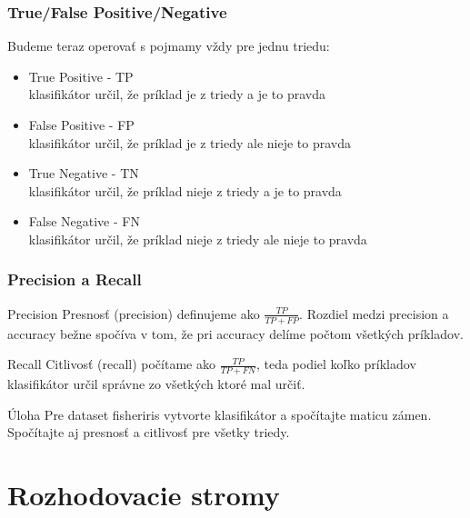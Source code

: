 \documentclass{beamer}
\begin{document}
\begin{frame}
\frametitle{True/False Positive/Negative}
Budeme teraz operovať s pojmamy vždy pre jednu triedu:
\begin{itemize}
\item True Positive - TP\\ klasifikátor určil, že príklad je z triedy a je to pravda
\item False Positive - FP\\ klasifikátor určil, že príklad je z triedy ale nieje to pravda
\item True Negative - TN\\  klasifikátor určil, že príklad nieje z triedy a je to pravda
\item False Negative - FN \\ klasifikátor určil, že príklad nieje z triedy ale nieje to pravda
\end{itemize}
\end{frame}

\begin{frame}
\frametitle{Precision a Recall}

\begin{block}{Precision}
Presnosť (precision) definujeme ako $\frac{TP}{TP + FP}$. Rozdiel medzi precision a accuracy bežne spočíva v tom, že pri accuracy delíme počtom všetkých príkladov.
\end{block}

\begin{block}{Recall}
Citlivosť (recall) počítame ako $\frac{TP}{TP + FN}$, teda podiel koľko príkladov klasifikátor určil správne zo všetkých ktoré mal určiť.
\end{block}

\begin{block}{Úloha}
Pre dataset fisheriris vytvorte klasifikátor a spočítajte maticu zámen. Spočítajte aj presnosť a citlivosť pre všetky triedy.
\end{block}

\end{frame}


\section{Rozhodovacie stromy}
\end{document}
